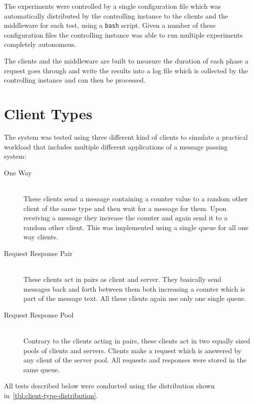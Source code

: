 \documentclass[a4paper, oneside]{csthesis}
\begin{document}
    The experiments were controlled by a single configuration file which was
    automatically distributed by the controlling instance to the clients and the
    middleware for each test, using a {\tt bash} script.
    Given a number of these configuration files the controlling instance was
    able to run multiple experiments completely autonomous.
    
    The clients and the middleware are built to measure the duration of each phase a request goes
    through and write the results into a log file which is collected by the controlling instance
    and can then be processed.
    
\section{Client Types}
\label{sec:client-types}

    The system was tested using three different kind of clients to simulate a
    practical workload that includes multiple different applications of a
    message passing system:
    
    \begin{description}
    \item[One Way] \ \\
        These clients send a message containing a counter value to a random
        other client of the same type and then wait for a message for them. Upon
        receiving a message they increase the counter and again send it to a
        random other client. This was implemented using a single queue for all
        one way clients.
    \item[Request Response Pair] \ \\
        These clients act in pairs as client and server. They basically send
        messages back and forth between them both increasing a counter which is
        part of the message text. All these clients again use only one
        single queue.
    \item[Request Response Pool] \ \\
        Contrary to the clients acting in pairs, these clients act in two
        equally sized pools of clients and servers. Clients make a request which
        is answered by any client of the server pool. All requests and responses
        were stored in the same queue.
    \end{description}
    
    All tests described below were conducted using the distribution shown
    in~\cref{tbl:client-type-distribution}.
\end{document}
